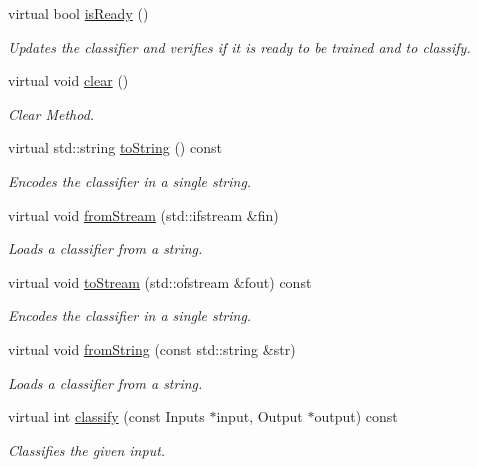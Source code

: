 \begin{DoxyCompactItemize}
\item 
virtual bool \hyperlink{classiCub_1_1boostMIL_1_1AvgClassifier_a18686e10e582a3e614f5748825434081}{is\+Ready} ()
\begin{DoxyCompactList}\small\item\em Updates the classifier and verifies if it is ready to be trained and to classify. \end{DoxyCompactList}\item 
virtual void \hyperlink{classiCub_1_1boostMIL_1_1AvgClassifier_a41e88fc8ff3b1ded52e0b2e9676fed96}{clear} ()
\begin{DoxyCompactList}\small\item\em Clear Method. \end{DoxyCompactList}\item 
virtual std\+::string \hyperlink{classiCub_1_1boostMIL_1_1AvgClassifier_aaaaf59125fa1f18075bc70e822b1055c}{to\+String} () const 
\begin{DoxyCompactList}\small\item\em Encodes the classifier in a single string. \end{DoxyCompactList}\item 
virtual void \hyperlink{classiCub_1_1boostMIL_1_1AvgClassifier_a924700fb2f5924e6a68a65cf827cf5f5}{from\+Stream} (std\+::ifstream \&fin)
\begin{DoxyCompactList}\small\item\em Loads a classifier from a string. \end{DoxyCompactList}\item 
virtual void \hyperlink{classiCub_1_1boostMIL_1_1AvgClassifier_ad02e72d71dbcc0abc2898752b57c3be1}{to\+Stream} (std\+::ofstream \&fout) const 
\begin{DoxyCompactList}\small\item\em Encodes the classifier in a single string. \end{DoxyCompactList}\item 
virtual void \hyperlink{classiCub_1_1boostMIL_1_1AvgClassifier_af820cbae5ef07d597d568597bf09d534}{from\+String} (const std\+::string \&str)
\begin{DoxyCompactList}\small\item\em Loads a classifier from a string. \end{DoxyCompactList}\item 
virtual int \hyperlink{classiCub_1_1boostMIL_1_1AvgClassifier_aa843a13c666b5ef24fbceb1245d0b3e7}{classify} (const Inputs $\ast$input, Output $\ast$output) const 
\begin{DoxyCompactList}\small\item\em Classifies the given input. \end{DoxyCompactList}\item 

\end{DoxyCompactItemize}
